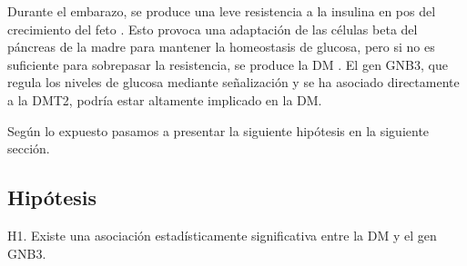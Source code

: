 Durante el embarazo, se produce una leve resistencia a la insulina en pos del crecimiento del feto \cite{Kalhan1999}. Esto provoca una adaptación de las células beta del páncreas de la madre para mantener la homeostasis de glucosa, pero si no es suficiente para sobrepasar la resistencia, se produce la DM \cite{Moyce2018}. El gen GNB3, que regula los niveles de glucosa mediante señalización y se ha asociado directamente a la DMT2\cite{Rizvi2016}, podría estar altamente implicado en la DM.

Según lo expuesto pasamos a presentar la siguiente hipótesis en la siguiente sección.

\subsection{Hipótesis}

H1. Existe una asociación estadísticamente significativa entre la DM y el gen GNB3.